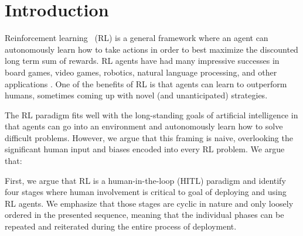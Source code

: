 \documentclass[twoside,11pt]{article}
\begin{document}
\section{Introduction}
\label{sec:introduction}

%


Reinforcement learning~\citep{SuttonBarto:2018:RLIntroduction} (RL) is a general framework where an agent can autonomously learn how to take actions in order to best maximize the discounted long term sum of rewards. RL agents have had many impressive successes in board games, video games, robotics, natural language processing, and other applications \citep{Li:2017:DRLSurvey}. One of the benefits of RL is that agents can learn to outperform humans, sometimes coming up with novel (and unanticipated) strategies.

The RL paradigm fits well with the long-standing goals of artificial intelligence in that agents can go into an environment and autonomously learn how to solve difficult problems. However, we argue that this framing is naive, overlooking the significant human input and biases encoded into every RL problem. We argue that: 
\begin{center}
\end{center}

First, we argue that RL is a human-in-the-loop (HITL) paradigm and identify four stages where human involvement is critical to goal of deploying and using RL agents. We emphasize that those stages are cyclic in nature and only loosely ordered in the presented sequence, meaning that the individual phases can be repeated and reiterated during the entire process of deployment.
\end{document}
